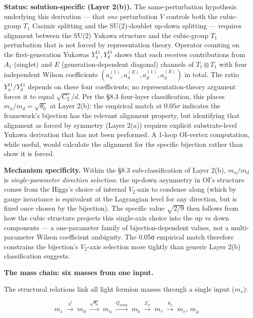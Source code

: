 \documentclass[
]{article}
\begin{document}
\textbf{Status: solution-specific (Layer 2(b)).} The same-perturbation
hypothesis underlying this derivation --- that \emph{one} perturbation
\(V\) controls both the cubic-group \(T_1\) Casimir splitting and the
SU(2)-doublet up-down splitting --- requires alignment between the SU(2)
Yukawa structure and the cubic-group \(T_1\) perturbation that is not
forced by representation theory. Operator counting on the
first-generation Yukawas \(Y_u^{11}, Y_d^{11}\) shows that each receives
contributions from \(A_1\) (singlet) and \(E\) (generation-dependent
diagonal) channels of \(T_1 \otimes T_1\) with four independent Wilson
coefficients \((a_u^{(1)}, a_u^{(E)}, a_d^{(1)}, a_d^{(E)})\) in total.
The ratio \(Y_u^{11}/Y_d^{11}\) depends on these four coefficients; no
representation-theory argument forces it to equal \(\sqrt{C_2}/d\). Per
the §8.3 four-layer classification, this places
\(m_u/m_d = \sqrt{\theta_0}\) at Layer 2(b): the empirical match at
\(0.05\sigma\) indicates the framework's bijection has the relevant
alignment property, but identifying that alignment as forced by symmetry
(Layer 2(a)) requires explicit substrate-level Yukawa derivation that
has not been performed. A 1-loop OI-vertex computation, while useful,
would calculate the alignment for the specific bijection rather than
show it is forced.

\textbf{Mechanism specificity.} Within the §8.3 sub-classification of
Layer 2(b), \(m_u/m_d\) is \emph{single-parameter direction selection}:
the up-down asymmetry in OI's structure comes from the Higgs's choice of
internal \(V_2\)-axis to condense along (which by gauge invariance is
equivalent at the Lagrangian level for any direction, but is fixed once
chosen by the bijection). The specific value \(\sqrt{2/9}\) then follows
from how the cubic structure projects this single-axis choice into the
up vs down components --- a one-parameter family of bijection-dependent
values, not a multi-parameter Wilson coefficient ambiguity. The 0.05σ
empirical match therefore constrains the bijection's \(V_2\)-axis
selection more tightly than generic Layer 2(b) classification suggests.

\textbf{The mass chain: six masses from one input.}

The structural relations link all light fermion masses through a single
input (\(m_s\)):

\[m_s \;\xrightarrow{\lambda^2}\; m_d \;\xrightarrow{\sqrt{\theta_0}}\; m_u \;\xrightarrow{Q_{\text{down}}}\; m_b \;\xrightarrow{Z_S}\; m_\tau \;\xrightarrow{\theta_0}\; m_e,\, m_\mu\]
\end{document}
